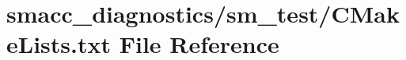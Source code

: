 \hypertarget{diagnostics_2sm__test_2CMakeLists_8txt}{}\section{smacc\+\_\+diagnostics/sm\+\_\+test/\+C\+Make\+Lists.txt File Reference}
\label{diagnostics_2sm__test_2CMakeLists_8txt}
